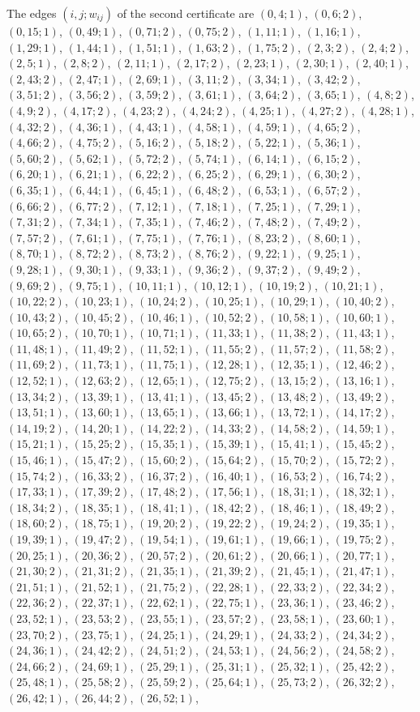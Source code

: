 \documentclass[11pt]{article}
\begin{document}
The edges $(i,j;w_{ij})$ of the second certificate are $(0,4;1)$, $(0,6;2)$, $(0,15;1)$, $(0,49;1)$, $(0,71;2)$, $(0,75;2)$, $(1,11;1)$, $(1,16;1)$, $(1,29;1)$, $(1,44;1)$, $(1,51;1)$, $(1,63;2)$, $(1,75;2)$, $(2,3;2)$, $(2,4;2)$, $(2,5;1)$, $(2,8;2)$, $(2,11;1)$, $(2,17;2)$, $(2,23;1)$, $(2,30;1)$, $(2,40;1)$, $(2,43;2)$, $(2,47;1)$, $(2,69;1)$, $(3,11;2)$, $(3,34;1)$, $(3,42;2)$, $(3,51;2)$, $(3,56;2)$, $(3,59;2)$, $(3,61;1)$, $(3,64;2)$, $(3,65;1)$, $(4,8;2)$, $(4,9;2)$, $(4,17;2)$, $(4,23;2)$, $(4,24;2)$, $(4,25;1)$, $(4,27;2)$, $(4,28;1)$, $(4,32;2)$, $(4,36;1)$, $(4,43;1)$, $(4,58;1)$, $(4,59;1)$, $(4,65;2)$, $(4,66;2)$, $(4,75;2)$, $(5,16;2)$, $(5,18;2)$, $(5,22;1)$, $(5,36;1)$, $(5,60;2)$, $(5,62;1)$, $(5,72;2)$, $(5,74;1)$, $(6,14;1)$, $(6,15;2)$, $(6,20;1)$, $(6,21;1)$, $(6,22;2)$, $(6,25;2)$, $(6,29;1)$, $(6,30;2)$, $(6,35;1)$, $(6,44;1)$, $(6,45;1)$, $(6,48;2)$, $(6,53;1)$, $(6,57;2)$, $(6,66;2)$, $(6,77;2)$, $(7,12;1)$, $(7,18;1)$, $(7,25;1)$, $(7,29;1)$, $(7,31;2)$, $(7,34;1)$, $(7,35;1)$, $(7,46;2)$, $(7,48;2)$, $(7,49;2)$, $(7,57;2)$, $(7,61;1)$, $(7,75;1)$, $(7,76;1)$, $(8,23;2)$, $(8,60;1)$, $(8,70;1)$, $(8,72;2)$, $(8,73;2)$, $(8,76;2)$, $(9,22;1)$, $(9,25;1)$, $(9,28;1)$, $(9,30;1)$, $(9,33;1)$, $(9,36;2)$, $(9,37;2)$, $(9,49;2)$, $(9,69;2)$, $(9,75;1)$, $(10,11;1)$, $(10,12;1)$, $(10,19;2)$, $(10,21;1)$, $(10,22;2)$, $(10,23;1)$, $(10,24;2)$, $(10,25;1)$, $(10,29;1)$, $(10,40;2)$, $(10,43;2)$, $(10,45;2)$, $(10,46;1)$, $(10,52;2)$, $(10,58;1)$, $(10,60;1)$, $(10,65;2)$, $(10,70;1)$, $(10,71;1)$, $(11,33;1)$, $(11,38;2)$, $(11,43;1)$, $(11,48;1)$, $(11,49;2)$, $(11,52;1)$, $(11,55;2)$, $(11,57;2)$, $(11,58;2)$, $(11,69;2)$, $(11,73;1)$, $(11,75;1)$, $(12,28;1)$, $(12,35;1)$, $(12,46;2)$, $(12,52;1)$, $(12,63;2)$, $(12,65;1)$, $(12,75;2)$, $(13,15;2)$, $(13,16;1)$, $(13,34;2)$, $(13,39;1)$, $(13,41;1)$, $(13,45;2)$, $(13,48;2)$, $(13,49;2)$, $(13,51;1)$, $(13,60;1)$, $(13,65;1)$, $(13,66;1)$, $(13,72;1)$, $(14,17;2)$, $(14,19;2)$, $(14,20;1)$, $(14,22;2)$, $(14,33;2)$, $(14,58;2)$, $(14,59;1)$, $(15,21;1)$, $(15,25;2)$, $(15,35;1)$, $(15,39;1)$, $(15,41;1)$, $(15,45;2)$, $(15,46;1)$, $(15,47;2)$, $(15,60;2)$, $(15,64;2)$, $(15,70;2)$, $(15,72;2)$, $(15,74;2)$, $(16,33;2)$, $(16,37;2)$, $(16,40;1)$, $(16,53;2)$, $(16,74;2)$, $(17,33;1)$, $(17,39;2)$, $(17,48;2)$, $(17,56;1)$, $(18,31;1)$, $(18,32;1)$, $(18,34;2)$, $(18,35;1)$, $(18,41;1)$, $(18,42;2)$, $(18,46;1)$, $(18,49;2)$, $(18,60;2)$, $(18,75;1)$, $(19,20;2)$, $(19,22;2)$, $(19,24;2)$, $(19,35;1)$, $(19,39;1)$, $(19,47;2)$, $(19,54;1)$, $(19,61;1)$, $(19,66;1)$, $(19,75;2)$, $(20,25;1)$, $(20,36;2)$, $(20,57;2)$, $(20,61;2)$, $(20,66;1)$, $(20,77;1)$, $(21,30;2)$, $(21,31;2)$, $(21,35;1)$, $(21,39;2)$, $(21,45;1)$, $(21,47;1)$, $(21,51;1)$, $(21,52;1)$, $(21,75;2)$, $(22,28;1)$, $(22,33;2)$, $(22,34;2)$, $(22,36;2)$, $(22,37;1)$, $(22,62;1)$, $(22,75;1)$, $(23,36;1)$, $(23,46;2)$, $(23,52;1)$, $(23,53;2)$, $(23,55;1)$, $(23,57;2)$, $(23,58;1)$, $(23,60;1)$, $(23,70;2)$, $(23,75;1)$, $(24,25;1)$, $(24,29;1)$, $(24,33;2)$, $(24,34;2)$, $(24,36;1)$, $(24,42;2)$, $(24,51;2)$, $(24,53;1)$, $(24,56;2)$, $(24,58;2)$, $(24,66;2)$, $(24,69;1)$, $(25,29;1)$, $(25,31;1)$, $(25,32;1)$, $(25,42;2)$, $(25,48;1)$, $(25,58;2)$, $(25,59;2)$, $(25,64;1)$, $(25,73;2)$, $(26,32;2)$, $(26,42;1)$, $(26,44;2)$, $(26,52;1)$, 
\end{document}
